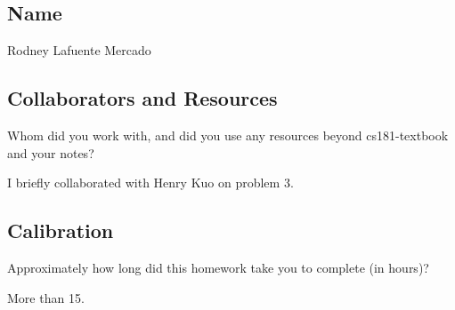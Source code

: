 \documentclass[submit]{harvardml}
\begin{document}
\subsection*{Name}
Rodney Lafuente Mercado

\subsection*{Collaborators and Resources}
Whom did you work with, and did you use any resources beyond cs181-textbook and your notes?

I briefly collaborated with Henry Kuo on problem 3. 
\subsection*{Calibration}
Approximately how long did this homework take you to complete (in hours)?

More than 15.
\end{document}
